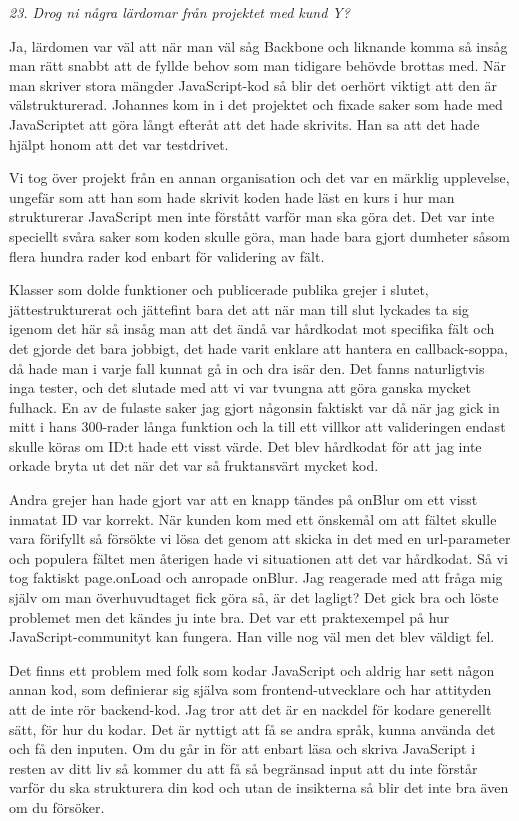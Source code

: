 \documentclass[11pt]{article}
\begin{document}
\emph{23. Drog ni några lärdomar från projektet med kund Y?}

Ja, lärdomen var väl att när man väl såg Backbone och liknande komma så insåg man rätt snabbt att de fyllde behov som man tidigare behövde brottas med. När man skriver stora mängder JavaScript-kod så blir det oerhört viktigt att den är välstrukturerad. Johannes kom in i det projektet och fixade saker som hade med JavaScriptet att göra långt efteråt att det hade skrivits. Han sa att det hade hjälpt honom att det var testdrivet.

Vi tog över projekt från en annan organisation och det var en märklig upplevelse, ungefär som att han som hade skrivit koden hade läst en kurs i hur man strukturerar JavaScript men inte förstått varför man ska göra det. Det var inte speciellt svåra saker som koden skulle göra, man hade bara gjort dumheter såsom flera hundra rader kod enbart för validering av fält.

Klasser som dolde funktioner och publicerade publika grejer i slutet, jättestrukturerat och jättefint bara det att när man till slut lyckades ta sig igenom det här så insåg man att det ändå var hårdkodat mot specifika fält och det gjorde det bara jobbigt, det hade varit enklare att hantera en callback-soppa, då hade man i varje fall kunnat gå in och dra isär den. Det fanns naturligtvis inga tester, och det slutade med att vi var tvungna att göra ganska mycket fulhack. En av de fulaste saker jag gjort någonsin faktiskt var då när jag gick in mitt i hans 300-rader långa funktion och la till ett villkor att valideringen endast skulle köras om ID:t hade ett visst värde. Det blev hårdkodat för att jag inte orkade bryta ut det när det var så fruktansvärt mycket kod.

Andra grejer han hade gjort var att en knapp tändes på onBlur om ett visst inmatat ID var korrekt. När kunden kom med ett önskemål om att fältet skulle vara förifyllt så försökte vi lösa det genom att skicka in det med en url-parameter och populera fältet men återigen hade vi situationen att det var hårdkodat. Så vi tog faktiskt page.onLoad och anropade onBlur. Jag reagerade med att fråga mig själv om man överhuvudtaget fick göra så, är det lagligt? Det gick bra och löste problemet men det kändes ju inte bra. Det var ett praktexempel på hur JavaScript-communityt kan fungera. Han ville nog väl men det blev väldigt fel.

Det finns ett problem med folk som kodar JavaScript och aldrig har sett någon annan kod, som definierar sig själva som frontend-utvecklare och har attityden att de inte rör backend-kod. Jag tror att det är en nackdel för kodare generellt sätt, för hur du kodar. Det är nyttigt att få se andra språk, kunna använda det och få den inputen. Om du går in för att enbart läsa och skriva JavaScript i resten av ditt liv så kommer du att få så begränsad input att du inte förstår varför du ska strukturera din kod och utan de insikterna så blir det inte bra även om du försöker.
\end{document}

